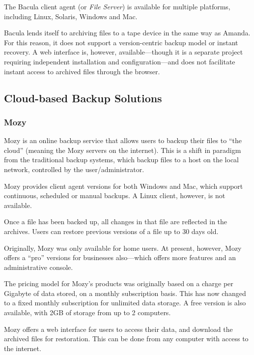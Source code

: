 \begin{bibunit}[plain]
The Bacula client agent (or \emph{File Server}) is available for multiple platforms,
including Linux, Solaris, Windows and Mac\cite{Bacula-features}.

Bacula lends itself to archiving files to a tape device in the same way as
Amanda.  For this reason, it does not support a version-centric backup model or
instant recovery. A web interface is, however, available---though it is
a separate project requiring independent installation and configuration---and
does not facilitate instant access to archived files through the
browser\cite{Bacula-about}.

\subsection{Cloud-based Backup Solutions}

\subsubsection{Mozy}

Mozy is an online backup service that allows users to backup their files to
``the cloud'' (meaning the Mozy servers on the internet)\cite{Mozy}. This is
a shift in paradigm from the traditional backup systems, which backup files to
a host on the local network, controlled by the user/administrator. 

Mozy provides client agent versions for both Windows and Mac, which support
continuous, scheduled or manual backups. A Linux client, however, is not
available\cite{Mozy}.

Once a file has been backed up, all changes in that file are reflected in the
archives. Users can restore previous versions of a file up to 30 days
old\cite{Mozy}.

Originally, Mozy was only available for home users. At present, however, Mozy
offers a ``pro'' versions for businesses also---which offers more features and
an administrative console\cite{Mozy-crunchbase}.

The pricing model for Mozy's products was originally based on a charge per
Gigabyte of data stored, on a monthly subscription
basis\cite{Carbonite-report}. This has now changed to a fixed monthly
subscription for unlimited data storage. A free version is also available, with
2GB of storage from up to 2 computers\cite{Mozy}.

Mozy offers a web interface for users to access their data, and download the
archived files for restoration. This can be done from any computer with access
to the internet\cite{Mozy}.


\end{bibunit}
